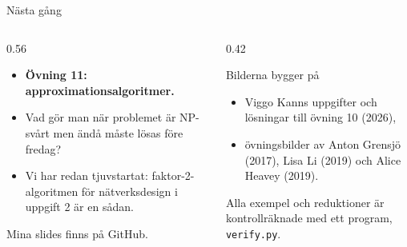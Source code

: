 \documentclass[aspectratio=169,10pt]{beamer}
\begin{document}
\begin{frame}{Nästa gång}
  \begin{columns}[T]
    \begin{column}{0.56\textwidth}
      \begin{itemize}
        \item \textbf{Övning 11: approximationsalgoritmer.}
        \item Vad gör man när problemet är NP-svårt men ändå måste lösas före fredag?
        \item Vi har redan tjuvstartat: faktor-2-algoritmen för nätverksdesign i uppgift 2 är en sådan.
      \end{itemize}
      \vspace{3mm}
      Mina slides finns på GitHub.
    \end{column}
    \begin{column}{0.42\textwidth}
      \begin{block}{Bilderna bygger på}
        \small
        \begin{itemize}
          \item Viggo Kanns uppgifter och lösningar till övning 10 (2026),
          \item övningsbilder av Anton Grensjö (2017), Lisa Li (2019) och Alice Heavey (2019).
        \end{itemize}
        Alla exempel och reduktioner är kontrollräknade med ett program, \texttt{verify.py}.
      \end{block}
    \end{column}
  \end{columns}
\end{frame}
\end{document}
